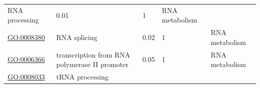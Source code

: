 \documentclass[
]{article}
\begin{document}
\begin{longtable}[]{@{}lllll@{}}
\begin{minipage}[t]{0.17\columnwidth}
RNA processing\strut
\end{minipage} & \begin{minipage}[t]{0.17\columnwidth}\raggedright
0.01\strut
\end{minipage} & \begin{minipage}[t]{0.17\columnwidth}\raggedright
1\strut
\end{minipage} & \begin{minipage}[t]{0.17\columnwidth}\raggedright
RNA metabolism\strut
\end{minipage}\tabularnewline
\begin{minipage}[t]{0.17\columnwidth}\raggedright
\url{GO:0008380}\strut
\end{minipage} & \begin{minipage}[t]{0.17\columnwidth}\raggedright
RNA splicing\strut
\end{minipage} & \begin{minipage}[t]{0.17\columnwidth}\raggedright
0.02\strut
\end{minipage} & \begin{minipage}[t]{0.17\columnwidth}\raggedright
1\strut
\end{minipage} & \begin{minipage}[t]{0.17\columnwidth}\raggedright
RNA metabolism\strut
\end{minipage}\tabularnewline
\begin{minipage}[t]{0.17\columnwidth}\raggedright
\url{GO:0006366}\strut
\end{minipage} & \begin{minipage}[t]{0.17\columnwidth}\raggedright
transcription from RNA polymerase II promoter\strut
\end{minipage} & \begin{minipage}[t]{0.17\columnwidth}\raggedright
0.05\strut
\end{minipage} & \begin{minipage}[t]{0.17\columnwidth}\raggedright
1\strut
\end{minipage} & \begin{minipage}[t]{0.17\columnwidth}\raggedright
RNA metabolism\strut
\end{minipage}\tabularnewline
\begin{minipage}[t]{0.17\columnwidth}\raggedright
\url{GO:0008033}\strut
\end{minipage} & \begin{minipage}[t]{0.17\columnwidth}\raggedright
tRNA processing\strut
\end{minipage} & \begin{minipage}[t]{0.17\columnwidth}\raggedright

\end{minipage}
\end{longtable}
\end{document}
